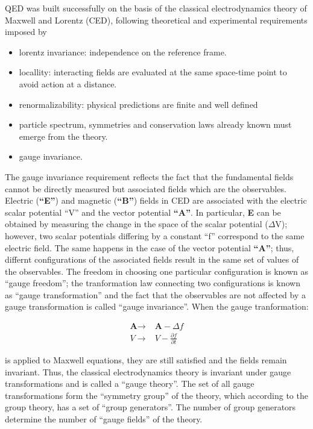 \noindent QED was built successfully on the basis of the classical electrodynamics theory of Maxwell and Lorentz (CED), following theoretical and experimental requirements imposed by

\begin{itemize}
\item lorentz invariance: independence on the reference frame.  
\item locallity: interacting fields are evaluated at the same space-time point to avoid action at a distance. 
\item renormalizability: physical predictions are finite and well defined 
\item particle spectrum, symmetries and conservation laws already known must emerge from the theory.
\item gauge invariance.
\end{itemize}

\noindent The gauge invariance requirement reflects the fact that the fundamental fields cannot be directly measured but associated fields which are the observables. Electric (\textbf{``E''}) and magnetic (\textbf{``B''}) fields in CED are associated with the electric scalar potential ``V'' and the vector potential \textbf{``A''}. In particular, \textbf{E} can be obtained by measuring the change in the space of the scalar potential (\textbf{$\Delta$}V); however, two scalar potentials differing by a constant ``f'' correspond to the same electric field. The same happens in the case of the vector potential \textbf{``A''}; thus, differnt configurations of the associated fields result in the same set of values of the observables. The freedom in choosing one particular configuration is known as ``gauge freedom''; the tranformation law connecting two configurations is known as ``gauge transformation'' and the fact that the observables are not affected by a gauge transformation is called ``gauge invariance''.
\noindent When the gauge tranformation:  

\begin{align}\label{cov_der}
\textbf{A} \to &\textbf{A} -\Delta f\nonumber\\
V \to & V - \frac{\partial f}{\partial t}
\end{align}

\noindent is applied to Maxwell equations, they are still satisfied and the fields remain invariant. Thus, the classical electrodynamics theory is invariant under gauge transformations and is called a ``gauge theory''. The set of all gauge transformations form the ``symmetry group'' of the theory, which according to the group theory, has a set of ``group generators''. The number of group generators determine the number of ``gauge fields'' of the theory.\\

